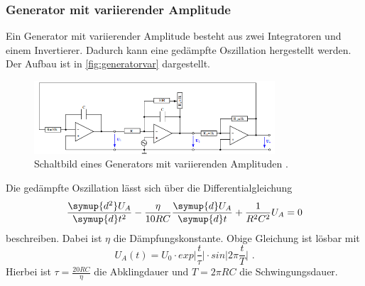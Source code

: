 \subsubsection{Generator mit variierender Amplitude}
Ein Generator mit variierender Amplitude besteht aus zwei Integratoren und einem Invertierer. Dadurch kann eine gedämpfte Oszillation hergestellt 
werden. Der Aufbau ist in \autoref{fig:generatorvar} dargestellt.
\begin{figure}
    \centering
    \includegraphics[width=0.8\textwidth]{generatorvar.png}
    \caption{Schaltbild eines Generators mit variierenden Amplituden \cite{ap51}.}
    \label{fig:generatorvar}
\end{figure}
Die gedämpfte Oszillation lässt sich über die Differentialgleichung
\begin{equation*}
    \frac{\symup{d^2}U_A}{\symup{d}t^2}- \frac{\eta}{10RC}\frac{\symup{d}U_A}{\symup{d}t}+\frac{1}{R^2C^2}U_A = 0
\end{equation*}
beschreiben. Dabei ist $\eta$ die Dämpfungskonstante. 
Obige Gleichung ist lösbar mit 
\begin{equation}
    U_A(t) = U_0\cdot exp\lvert \frac{t}{\tau}\rvert \cdot sin \lvert 2\pi\frac{t}{T}\rvert \,\,\text{.}
    \label{eqn:dgllsg}
\end{equation}
Hierbei ist $\tau = \frac{20RC}{\eta}$ die Abklingdauer und $T=2\pi RC$ die Schwingungsdauer.